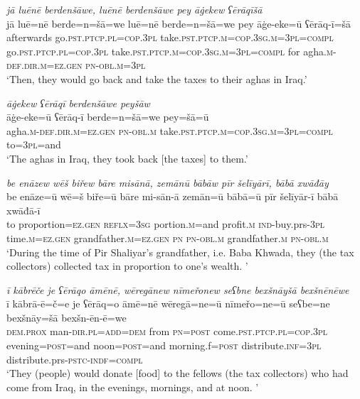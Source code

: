 \ea \label{BP.27}
\textit{jā luēnē berdenšāwe, luēnē berdenšāwe pey āġekew ʕērāqīšā} \\ 
\gll jā luē=nē berde=n=šā=we luē=nē berde=n=šā=we pey āġe-eke=ū ʕērāq-ī=šā \\ 
 afterwards go\textsc{.pst}\textsc{.ptcp}\textsc{.pl}\textsc{=cop}\textsc{.3pl} take\textsc{.pst}\textsc{.ptcp}\textsc{.m}\textsc{=cop}\textsc{.3sg}\textsc{.m}\textsc{=3pl}\textsc{=compl} go\textsc{.pst}\textsc{.ptcp}\textsc{.pl}\textsc{=cop}\textsc{.3pl} take\textsc{.pst}\textsc{.ptcp}\textsc{.m}\textsc{=cop}\textsc{.3sg}\textsc{.m}\textsc{=3pl}\textsc{=compl} for agha\textsc{.m}\textsc{-def}\textsc{.dir}\textsc{.m}\textsc{=ez.gen} \textsc{pn}\textsc{-obl}\textsc{.m}\textsc{=3pl} \\ 
\glt `Then, they would go back and take the taxes to their aghas in Iraq.'
\z 
 
\ea \label{BP.28}
\textit{āġekew ʕērāqī berdenšāwe peyšāw} \\ 
\gll āġe-eke=ū ʕērāq-ī berde=n=šā=we pey=šā=ū \\ 
 agha\textsc{.m}\textsc{-def}\textsc{.dir}\textsc{.m}\textsc{=ez.gen} \textsc{pn}\textsc{-obl}\textsc{.m} take\textsc{.pst}\textsc{.ptcp}\textsc{.m}\textsc{=cop}\textsc{.3sg}\textsc{.m}\textsc{=3pl}\textsc{=compl} to\textsc{=3pl}=and \\ 
\glt `The aghas in Iraq, they took back [the taxes] to them.'
\z 
 
\ea \label{BP.31}
\textit{be enāzew wēš biřew bāre misānā, zemānū bābāw pīr šelīyārī, bābā xwāđāy} \\ 
\gll be enāze=ū wē=š biře=ū bāre mi-sān-ā zemān=ū bābā=ū pīr šelīyār-ī bābā xwāđā-ī \\ 
 to proportion\textsc{=ez.gen} \textsc{reflx}\textsc{=3sg} portion\textsc{.m}=and profit\textsc{.m} \textsc{ind-}buy.prs\textsc{-3pl} time\textsc{.m}\textsc{=ez.gen} grandfather\textsc{.m}\textsc{=ez.gen} \textsc{pn} \textsc{pn}\textsc{-obl}\textsc{.m} grandfather\textsc{.m} \textsc{pn}\textsc{-obl}\textsc{.m} \\ 
\glt `During the time of Pir Shaliyar’s grandfather, i.e. Baba Khwada, they (the tax collectors) collected tax in proportion to one’s wealth. '
\z 
 
\ea \label{BP.38}
\textit{ī kābrēče je ʕērāqo āmēnē, wēregānew nīmeřonew seʕbne bexšnāyšā bexšnēnēwe} \\ 
\gll ī kābrā-ē=č=e je ʕērāq=o āmē=nē wēregā=ne=ū nīmeřo=ne=ū seʕbe=ne bexšnāy=šā bexšn-ēn-ē=we \\ 
 \textsc{dem.prox} man\textsc{-dir}\textsc{.pl}\textsc{=add}\textsc{=dem} from \textsc{pn}\textsc{=\textsc{post}} come\textsc{.pst}\textsc{.ptcp}\textsc{.pl}\textsc{=cop}\textsc{.3pl} evening\textsc{=\textsc{post}}=and noon\textsc{=\textsc{post}}=and morning.f\textsc{=\textsc{post}} distribute\textsc{.inf}\textsc{=3pl} distribute.prs\textsc{-pstc}\textsc{-indf}\textsc{=compl} \\ 
\glt `They (people) would donate [food] to the fellows (the tax collectors) who had come from Iraq, in the evenings, mornings, and at noon. '
\z 
 
